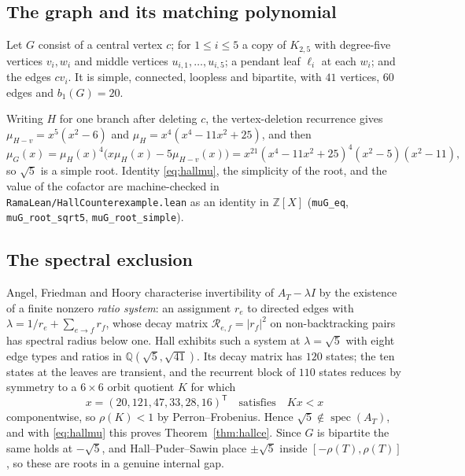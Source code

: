 \documentclass[11pt]{article}
\theoremstyle{remark}
\begin{document}
\subsection{The graph and its matching polynomial}

Let $G$ consist of a central vertex $c$; for $1\le i\le5$ a copy of $K_{2,5}$ with
degree-five vertices $v_i,w_i$ and middle vertices $u_{i,1},\dots,u_{i,5}$; a pendant leaf
$\ell_i$ at each $w_i$; and the edges $cv_i$. It is simple, connected, loopless and
bipartite, with $41$ vertices, $60$ edges and $b_1(G)=20$.

Writing $H$ for one branch after deleting $c$, the vertex-deletion recurrence gives
$\mu_{H-v}=x^5(x^2-6)$ and $\mu_H=x^4(x^4-11x^2+25)$, and then
\begin{equation}\label{eq:hallmu}
   \mu_G(x)=\mu_H(x)^4\bigl(x\mu_H(x)-5\mu_{H-v}(x)\bigr)
   =x^{21}(x^4-11x^2+25)^4(x^2-5)(x^2-11),
\end{equation}
so $\sqrt5$ is a simple root. Identity \eqref{eq:hallmu}, the simplicity of the root, and
the value of the cofactor are machine-checked in \texttt{RamaLean/HallCounterexample.lean}
as an identity in $\mathbb Z[X]$ (\texttt{muG\_eq}, \texttt{muG\_root\_sqrt5},
\texttt{muG\_root\_simple}).

\subsection{The spectral exclusion}

Angel, Friedman and Hoory \cite{AFH} characterise invertibility of $A_T-\lambda I$ by the
existence of a finite nonzero \emph{ratio system}: an assignment $r_e$ to directed edges
with $\lambda=1/r_e+\sum_{e\to f}r_f$, whose decay matrix $\mathcal R_{e,f}=|r_f|^2$ on
non-backtracking pairs has spectral radius below one. Hall exhibits such a system at
$\lambda=\sqrt5$ with eight edge types and ratios in $\mathbb Q(\sqrt5,\sqrt{41})$. Its
decay matrix has $120$ states; the ten states at the leaves are transient, and the
recurrent block of $110$ states reduces by symmetry to a $6\times6$ orbit quotient $K$ for
which
\[
   x=(20,121,47,33,28,16)^{\mathsf T}\quad\text{satisfies}\quad Kx<x
\]
componentwise, so $\rho(K)<1$ by Perron--Frobenius. Hence $\sqrt5\notin
\operatorname{spec}(A_T)$, and with \eqref{eq:hallmu} this proves
Theorem~\ref{thm:hallce}. Since $G$ is bipartite the same holds at $-\sqrt5$, and
Hall--Puder--Sawin place $\pm\sqrt5$ inside $[-\rho(T),\rho(T)]$, so these are roots in a
genuine internal gap.
\end{document}
